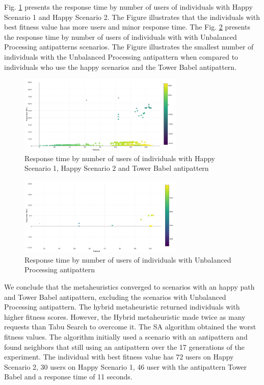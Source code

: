 Fig. \ref{fig:responsetimegenerationalltests2} presents the response time by number of users of individuals with Happy Scenario 1 and Happy Scenario 2. The Figure illustrates that the individuals with best fitness value has more users and minor response time. The Fig. \ref{fig:fitnessgenerationalltests2-1} presents the response time by number of users of individuals with with Unbalanced Processing antipatterns scenarios. The Figure illustrates the smallest number of individuals with the  Unbalanced Processing antipattern when compared to individuals who use the happy scenarios and the Tower Babel antipattern.



\begin{figure}[h]
\centering
\includegraphics[width=0.7\textwidth]{./images/experiment2-5.png}
\caption{Response time by number of users of individuals with Happy Scenario 1, Happy Scenario 2 and Tower Babel antipattern}
\label{fig:responsetimegenerationalltests2}
\end{figure}


\begin{figure}[h]
\centering
\includegraphics[width=0.7\textwidth]{./images/experiment2-6.png}
\caption{Response time by number of users of individuals with Unbalanced Processing antipattern}
\label{fig:fitnessgenerationalltests2-1}
\end{figure}


We conclude that the metaheuristics converged to scenarios with an happy path and Tower Babel antipattern, excluding the scenarios with Unbalanced Processing antipattern. The hybrid metaheuristic returned individuals with higher fitness scores. However, the Hybrid metaheuristic made twice as many requests than Tabu Search to overcome it. The SA algorithm obtained the worst fitness values. The algorithm initially used a scenario with an antipattern and found neighbors that still using an antipattern over the 17 generations of the experiment. The individual with best fitness value has 72 users on Happy Scenario 2, 30 users on Happy Scenario 1, 46 user with the antipattern Tower Babel and a response time of 11 seconds.


